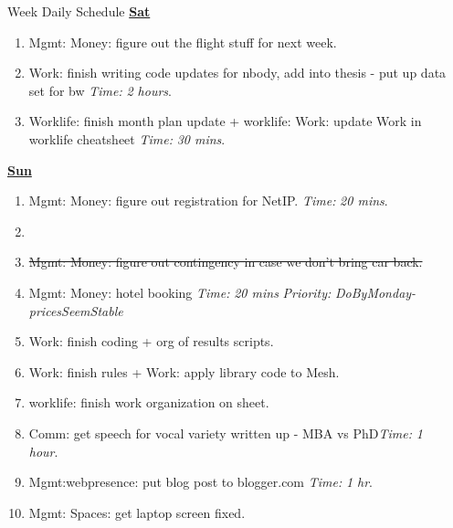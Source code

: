 \documentclass[serif, mathserif, final]{beamer}
\newcommand{\doneTask}[1]{\item \sout{#1}}
\newcommand{\timeEst}[1]{\textit{Time:} \textit{#1}}
\newcommand{\priority}[1]{\textit{Priority:} \textit{#1}}
\begin{document}
\begin{frame}{}
\begin{columns}
\begin{column}{0.50\linewidth}
\begin{block}{Week Daily Schedule}
\textbf{\small \underline{Sat}} 
\begin{enumerate} 

\item \tiny Mgmt: Money: figure out the flight stuff for next week. 

\item \tiny Work: finish writing code updates for nbody, add into thesis - put up data set for bw \timeEst{2 hours}. 

\item \tiny Worklife: finish month plan update +  worklife: Work: update Work in worklife cheatsheet \timeEst{30 mins}. 

\end{enumerate} 

\textbf{\small \underline{Sun}}
\begin{enumerate} 
\item \tiny Mgmt: Money: figure out registration for NetIP. \timeEst{20 mins}. 

\item \tiny \doneTask{Mgmt: Money: figure out contingency in case we don't bring car back. }
\item \tiny Mgmt: Money: hotel booking \timeEst{20 mins} \priority{DoByMonday-pricesSeemStable} 

\item \tiny Work: finish coding + org of results scripts. 
\item \tiny Work: finish rules  +  Work: apply library code to Mesh. 
\item \tiny worklife: finish work organization on sheet. 

\item \tiny Comm: get speech for vocal variety written up - MBA vs PhD\timeEst{1 hour}. 
\item \tiny Mgmt:webpresence: put blog post to blogger.com \timeEst{1 hr}.  
\item \tiny Mgmt: Spaces: get laptop screen fixed. 

\end{enumerate} 
\end{block} 


\end{column}%

\begin{column}{0.20\linewidth} 


\end{column}
\end{columns}
\end{frame}
\end{document}
